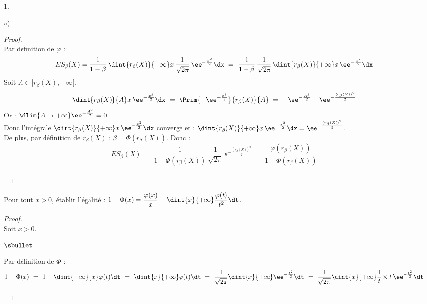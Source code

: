 \begin{noliste}{1.}
\begin{noliste}{a)}
    \begin{proof}~\\
      Par définition de $\varphi$ :
      \[
        ES_\beta(X) = \dfrac{1}{1-\beta} \, \dint{r_\beta(X)}
        {+\infty} x \, \dfrac{1}{\sqrt{2 \pi}} \, \ee^{-\frac{x^2}{2}}
        \dx \ = \ \dfrac{1}{1-\beta} \, \dfrac{1}{\sqrt{2 \pi}} \,
        \dint{r_\beta(X)}{+\infty} x \, \ee^{-\frac{x^2}{2}} \dx
      \]
      Soit $A \in [r_\beta(X), +\infty[$.
      \[
        \dint{r_\beta(X)}{A} x\, \ee^{-\frac{x^2}{2}} \dx \ = \
          \Prim{-\ee^{-\frac{x^2}{2}}}{r_\beta(X)}{A}
          \ = \ -\ee^{-\frac{A^2}{2}} + \ee^{-\frac{(r_\beta(X))^2}{2}}
      \]
      Or : $\dlim{A \to +\infty} \ee^{-\frac{A^2}{2}} =
      0$.\\
      Donc l'intégrale $\dint{r_\beta(X)}{+\infty} x \, 
      \ee^{-\frac{x^2}{2}} \dx$ converge et : 
      $\dint{r_\beta(X)}{+\infty} x \, \ee^{-\frac{x^2}{2}} \dx = 
      \ee^{-\frac{(r_\beta(X))^2}{2}}$.\\
      De plus, par définition de $r_\beta(X)$ : $\beta = 
      \Phi(r_\beta(X))$. Donc :
      \[
        ES_\beta(X) \ = \ \dfrac{1}{1-\Phi(r_\beta(X))} \, 
        \dfrac{1}{\sqrt{2 \pi}} \, \ee^{-\frac{(r_\beta(X))^2}{2}}
        \ = \ \dfrac{\varphi(r_\beta(X))}{1-\Phi(r_\beta(X))}
      \]
      ~\\[-1cm]
    \end{proof}
    
    \item Pour tout $x >0$, établir l'égalité : $1-\Phi(x)=
    \dfrac{\varphi(x)}{x}-\dint{x}{+\infty} \dfrac{\varphi(t)}{t^2} 
    \dt$.
    
    \begin{proof}~\\
      Soit $x>0$.
      \begin{noliste}{$\sbullet$}
	\item Par définition de $\Phi$ :
	\[
	  1-\Phi(x) \ = \ 1- \dint{-\infty}{x} \varphi(t) \dt
	  \ = \ \dint{x}{+\infty} \varphi(t) \dt \ = \
	  \dfrac{1}{\sqrt{2 \pi}} \dint{x}{+\infty} 
	  \ee^{-\frac{t^2}{2}} \dt \ = \ \dfrac{1}{\sqrt{2 \pi}}
	  \dint{x}{+\infty} \dfrac{1}{t} \times t \, 
	  \ee^{-\frac{t^2}{2}} \dt
	\]
	

\end{noliste}
\end{proof}
\end{noliste}
\end{noliste}
